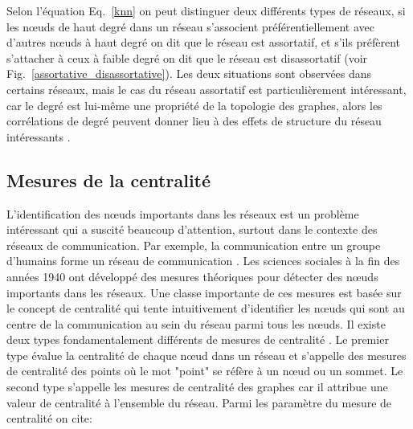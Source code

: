 Selon l'équation Eq.~\eqref{knn} on peut distinguer deux différents types de réseaux, si les nœuds de haut degré dans un réseau  s'associent préférentiellement avec d'autres nœuds à haut degré on dit que le réseau est assortatif, et s'ils préfèrent  s'attacher à ceux à faible degré on dit que le réseau est disassortatif (voir Fig.~\ref{assortative_disassortative}). Les deux situations sont observées dans certains réseaux, mais le cas du réseau assortatif est particulièrement intéressant, car le degré est lui-même une propriété de la topologie des graphes, alors les corrélations de degré peuvent donner lieu à des effets de structure du réseau intéressants \cite{MS2002,Ne2003}. 

\subsection{Mesures de la centralité}

L'identification des nœuds importants dans les réseaux est un problème intéressant qui a suscité beaucoup d'attention, surtout dans le contexte des réseaux de communication. Par exemple, la communication entre un groupe d'humains forme un réseau de communication \cite{Dehmer2011}. Les sciences sociales à la fin des années 1940 ont développé des mesures théoriques pour détecter des nœuds importants dans les réseaux. Une classe importante de ces mesures est basée sur le concept de centralité \cite{Hage-Harary1995,Wasserman-Faust1994} qui tente intuitivement d'identifier les nœuds qui sont au centre de la communication au sein du réseau parmi tous les nœuds. Il existe deux types fondamentalement différents de mesures de centralité \cite{Freeman1977}. Le premier type évalue la centralité de chaque nœud dans un réseau et s'appelle des mesures de centralité des points où le mot "point" se réfère à un nœud ou un sommet. Le second type s'appelle les mesures de centralité des graphes car il attribue une valeur de centralité à l'ensemble du réseau. Parmi les paramètre du mesure de centralité on cite:\\

